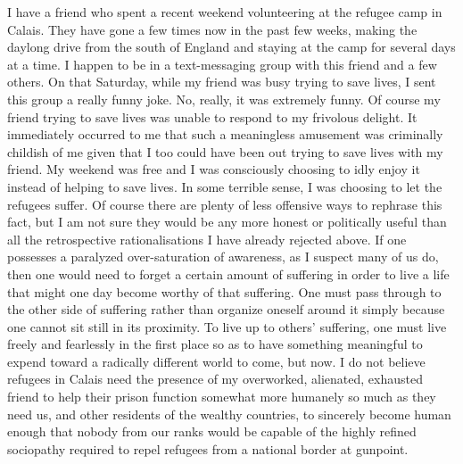 \documentclass[a4paper,12pt,margin=.5in]{article}
\begin{document}
I have a friend who spent a recent weekend volunteering at the refugee
camp in Calais. They have gone a few times now in the past few weeks,
making the daylong drive from the south of England and staying at the
camp for several days at a time. I happen to be in a text-messaging
group with this friend and a few others. On that Saturday, while my
friend was busy trying to save lives, I sent this group a really funny
joke. No, really, it was extremely funny. Of course my friend trying to
save lives was unable to respond to my frivolous delight. It immediately
occurred to me that such a meaningless amusement was criminally childish
of me given that I too could have been out trying to save lives with my
friend. My weekend was free and I was consciously choosing to idly enjoy
it instead of helping to save lives. In some terrible sense, I was
choosing to let the refugees suffer. Of course there are plenty of less
offensive ways to rephrase this fact, but I am not sure they would be
any more honest or politically useful than all the retrospective
rationalisations I have already rejected above. If one possesses a
paralyzed over-saturation of awareness, as I suspect many of us do, then
one would need to forget a certain amount of suffering in order to live
a life that might one day become worthy of that suffering. One must pass
through to the other side of suffering rather than organize oneself
around it simply because one cannot sit still in its proximity. To live
up to others' suffering, one must live freely and fearlessly in the
first place so as to have something meaningful to expend toward a
radically different world to come, but now. I do not believe refugees in
Calais need the presence of my overworked, alienated, exhausted friend
to help their prison function somewhat more humanely so much as they
need us, and other residents of the wealthy countries, to sincerely
become human enough that nobody from our ranks would be capable of the
highly refined sociopathy required to repel refugees from a national
border at gunpoint.
\end{document}
